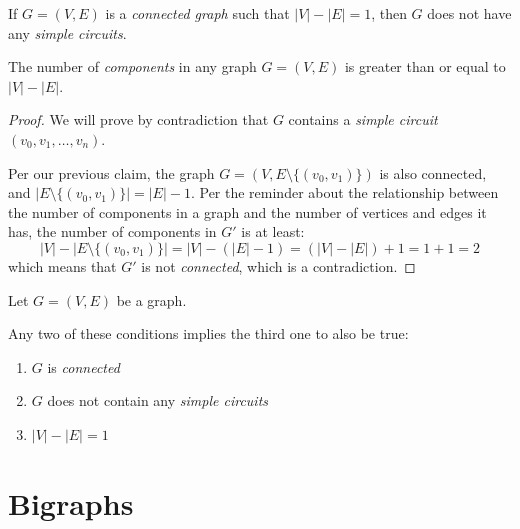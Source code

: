 \documentclass[00_complete]{subfiles}
\begin{document}
\begin{claim}
    If $G=(V,E)$ is a \emph{connected graph} such that $|V|-|E|=1$, then $G$
    does not have any \emph{simple circuits}.
\end{claim}
\begin{reminder}
    The number of \emph{components} in any graph $G=(V,E)$ is greater than or equal
    to $|V|-|E|$.
\end{reminder}
\begin{proof}
    We will prove by contradiction that $G$ contains a \emph{simple circuit}
    $(v_0,v_1,\dots,v_n)$.

    Per our previous claim, the graph $G=(V,E\setminus\{(v_0,v_1)\})$ is also
    connected, and $|E\setminus\{(v_0,v_1)\}|=|E|-1$. Per the reminder about
    the relationship between the number of components in a graph and the
    number of vertices and edges it has, the number of components in $G'$ is at
    least:
    $$|V|-|E\setminus\{(v_0,v_1)\}|=|V|-(|E|-1)=(|V|-|E|)+1=1+1=2$$
    which means that $G'$ is not \emph{connected}, which is a contradiction.
\end{proof}
\begin{theorem}[Trees]
    Let $G=(V,E)$ be a graph.

    Any two of these conditions implies the third one to also be true:
    \begin{enumerate} \tightlist
        \item $G$ is \emph{connected}
        \item $G$ does not contain any \emph{simple circuits}
        \item $|V|-|E|=1$
    \end{enumerate}
\end{theorem}
\section{Bigraphs}
\end{document}
